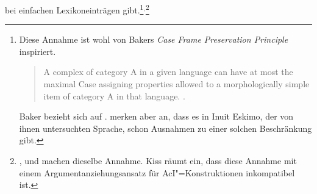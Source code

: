 bei einfachen Lexikoneinträgen gibt.\footnote{
  Diese Annahme ist wohl von Bakers \emph{Case Frame Preservation Principle}
  inspiriert.
  \begin{quote}
    A complex \xnull of category A in a given language can have
    at most the maximal Case assigning properties allowed to a morphologically
    simple item of category A in that language. \citep[]{Baker88a}.
  \end{quote}%
  Baker bezieht sich auf . \citet[]{GM85a} merken aber
  an, dass es in Inuit Eskimo, der von ihnen untersuchten Sprache, schon
  Ausnahmen zu einer solchen Beschränkung gibt.%
}$^,$\footnote{
        \textcites[]{Haider86c}[]{Haider90b},
        \citet[]{Kiss95a} und
        \citet[]{Kathol2000a} machen dieselbe Annahme.
        Kiss räumt ein, dass diese Annahme mit einem Argumentanziehungsansatz für
        AcI"=Konstruktionen inkompatibel ist.

}
